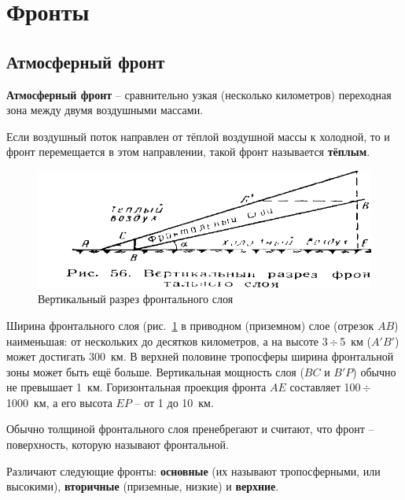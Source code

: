 \documentclass[a4paper, 12pt, twoside, final, book, russian, fittopage, cyremdash, openright]{ncc}
\newcommand{\otdo}{\,\ensuremath{\div}\,}
\begin{document}
\section{Фронты}

\subsection{Атмосферный фронт}
\label{sec:front}

\textbf{Атмосферный фронт} \--- сравнительно
узкая (несколько километров) переходная зона между двумя воздушными
массами.

Если воздушный поток направлен от тёплой воздушной массы к холодной,
то и фронт перемещается в этом направлении, такой фронт называется
\textbf{тёплым}.

\begin{figure}[htb]
   \centering
   \includegraphics[scale=1.0]{05_vertical_front.pdf}
   \caption{Вертикальный разрез фронтального слоя}
   \label{fig:05_vertical_front}
\end{figure}

Ширина фронтального слоя (рис.~\ref{fig:05_vertical_front} в приводном
(приземном) слое (отрезок $AB$) наименьшая: от нескольких до десятков
километров, а на высоте 3\otdo{}5~км ($A'B'$) может достигать
300~км. В верхней половине тропосферы ширина фронтальной зоны может
быть ещё больше. Вертикальная мощность слоя ($BC$ и $B'P$) обычно не
превышает 1~км. Горизонтальная проекция фронта $AE$ составляет
100\otdo{}1000~км, а его высота $EP$ \--- от 1 до 10~км.

Обычно толщиной фронтального слоя пренебрегают и считают, что фронт
\--- поверхность, которую называют фронтальной.

Различают следующие фронты: \textbf{основные}
(их называют тропосферными, или
высокими), \textbf{вторичные}
(приземные, низкие) и
\textbf{верхние}.
\end{document}
